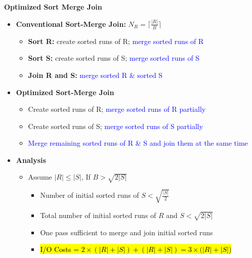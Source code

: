 \documentclass[10pt,landscape]{article}
\newcommand{\1}{\mathmybb{1}}
\begin{document}
\begin{multicols*}{3}
\textbf{Optimized Sort Merge Join}
\begin{itemize}
    \item \textbf{Conventional Sort-Merge Join:} $N_R = \lceil \frac{|R|}{B} \rceil$ 
    \begin{itemize}
        \item \textbf{Sort R:} create sorted runs of R; \textcolor{blue}{merge sorted runs of R}
        \item \textbf{Sort S:} create sorted runs of S; \textcolor{blue}{merge sorted runs of S}
        \item \textbf{Join R and S:} \textcolor{blue}{merge sorted R \& sorted S}
    \end{itemize}
    \item \textbf{Optimized Sort-Merge Join}
    \begin{itemize}
        \item Create sorted runs of R; \textcolor{blue}{merge sorted runs of R partially}
        \item Create sorted runs of S; \textcolor{blue}{merge sorted runs of S partially}
        \item \textcolor{blue}{Merge remaining sorted runs of R \& S and join them at the same time}
    \end{itemize}
    \item \textbf{Analysis}
    \begin{itemize}
        \item Assume $|R| \leq |S|$,  If $B > \sqrt{2|S|}$
        \begin{itemize}
            \item Number of initial sorted runs of $S < \sqrt{\frac{|S|}{2}}$
            \item Total number of initial sorted runs of $R$ and $S < \sqrt{2|S|}$
            \item One pass sufficient to merge and join initial sorted runs
            \item \hl{I/O Costs = $2 \times (|R| + |S|) + (|R| + |S|) = 3 \times (|R| + |S|$)}
        \end{itemize}
    \end{itemize}
\end{itemize}


\end{multicols*}
\end{document}
